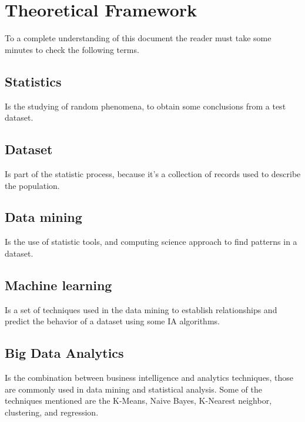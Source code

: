 \section{Theoretical Framework}
To a complete understanding of this document the reader must take some minutes to check the following terms.
 \subsection{Statistics}
 Is the studying of random phenomena, to obtain some conclusions from a test dataset.
 \subsection{Dataset}
 Is part of the statistic process, because it's a collection of records used to describe the population.
 \subsection{Data mining}
 Is the use of statistic tools, and computing science approach to find patterns in a dataset.
 \subsection{Machine learning}
 Is a set of techniques used in the data mining to establish relationships and predict the behavior of a dataset using some IA algorithms.
 \subsection{Big Data Analytics}
 Is the combination between business intelligence and analytics techniques, those are commonly used in data mining and statistical analysis. Some of the techniques mentioned are the K-Means, Naive Bayes, K-Nearest neighbor, clustering, and regression.
 
